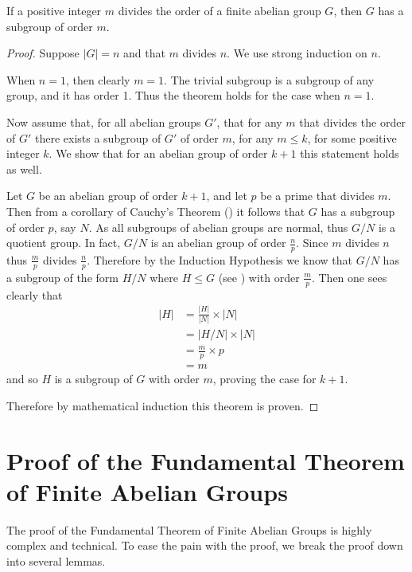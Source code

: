 \begin{theorem}
    If a positive integer $m$ divides the order of a finite abelian group $G$, then $G$ has a subgroup of order $m$.
\end{theorem}
\begin{proof}
    Suppose $|G| = n$ and that $m$ divides $n$. We use strong induction on $n$.

    When $n = 1$, then clearly $m = 1$. The trivial subgroup is a subgroup of any group, and it has order 1. Thus the theorem holds for the case when $n = 1$.

    Now assume that, for all abelian groups $G'$, that for any $m$ that divides the order of $G'$ there exists a subgroup of $G'$ of order $m$, for any $m \leq k$, for some positive integer $k$. We show that for an abelian group of order $k+1$ this statement holds as well.
    
    Let $G$ be an abelian group of order $k+1$, and let $p$ be a prime that divides $m$. Then from a corollary of Cauchy's Theorem () it follows that $G$ has a subgroup of order $p$, say $N$. As all subgroups of abelian groups are normal, thus $G/N$ is a quotient group. In fact, $G/N$ is an abelian group of order $\frac np$. Since $m$ divides $n$ thus $\frac mp$ divides $\frac np$. Therefore by the Induction Hypothesis we know that $G/N$ has a subgroup of the form $H/N$ where $H \leq G$ (see ) with order $\frac mp$. Then one sees clearly that
    \begin{align*}
        |H| &= \frac{|H|}{|N|} \times |N|\\
        &= |H/N| \times |N|\\
        &= \frac mp \times p\\
        &= m
    \end{align*}
    and so $H$ is a subgroup of $G$ with order $m$, proving the case for $k+1$.

    Therefore by mathematical induction this theorem is proven.
\end{proof}

\section{Proof of the Fundamental Theorem of Finite Abelian Groups}
The proof of the Fundamental Theorem of Finite Abelian Groups is highly complex and technical. To ease the pain with the proof, we break the proof down into several lemmas.

